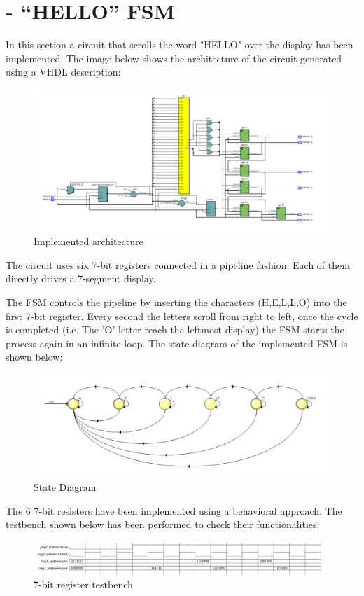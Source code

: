 \documentclass[12pt]{article}
\begin{document}
\section{- “HELLO” FSM}
In this section a circuit that scrolls the word "HELLO" over the display has been implemented.
The image below shows the architecture of the circuit generated using a VHDL description:

\begin{figure}[h]
	\centering
	\includegraphics[scale = 0.47]{immagini/niki/rtl.PNG}
	\caption{Implemented architecture}
\end{figure}

The circuit uses six 7-bit registers connected in a pipeline fashion. Each of them directly drives a 7-segment display. 

The FSM controls the pipeline by inserting the characters (H,E,L,L,O) into the first 7-bit register.
Every second the letters scroll  from right to left, once the cycle is completed (i.e. The 'O' letter reach the leftmost display) the FSM starts the process again in an infinite loop.
The state diagram of the implemented FSM is shown below:
\begin{figure}[!h]
	\centering
	\includegraphics[scale = 0.45]{immagini/niki/statemachine.PNG}
	\caption{State Diagram}
\end{figure}
\newpage
The 6 7-bit resisters have been implemented using a behavioral approach. The testbench shown below has been performed to check their functionalities:
\begin{figure}[!h]
	\centering
	\includegraphics[scale = 0.55]{immagini/niki/reg.PNG}
	\caption{7-bit register testbench}
\end{figure}
\end{document}
